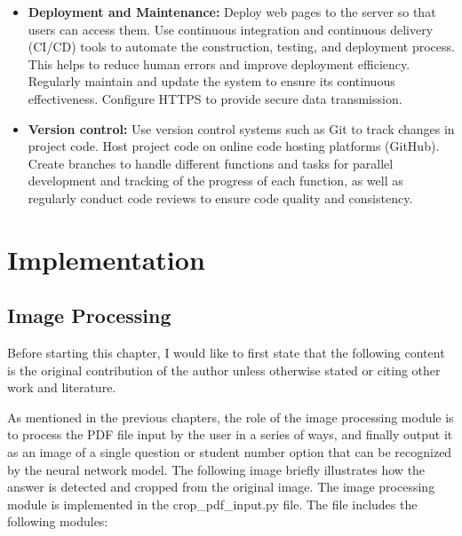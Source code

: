 \documentclass[twocolumn]{article}
\begin{document}
\begin{itemize}
        \item \textbf{Deployment and Maintenance:} Deploy web pages to the server so that users can access them. Use continuous integration and continuous delivery (CI/CD) tools to automate the construction, testing, and deployment process. This helps to reduce human errors and improve deployment efficiency. Regularly maintain and update the system to ensure its continuous effectiveness. Configure HTTPS to provide secure data transmission.
        \item \textbf{Version control:} Use version control systems such as Git to track changes in project code. Host project code on online code hosting platforms (GitHub). Create branches to handle different functions and tasks for parallel development and tracking of the progress of each function, as well as regularly conduct code reviews to ensure code quality and consistency.
    \end{itemize} 

\section{Implementation}

    \subsection{Image Processing}
    Before starting this chapter, I would like to first state that the following content is the original contribution of the author unless otherwise stated or citing other work and literature.

    As mentioned in the previous chapters, the role of the image processing module is to process the PDF file input by the user in a series of ways, and finally output it as an image of a single question or student number option that can be recognized by the neural network model. The following image briefly illustrates how the answer is detected and cropped from the original image. The image processing module is implemented in the crop\_pdf\_input.py file. The file includes the following modules:
\end{document}

